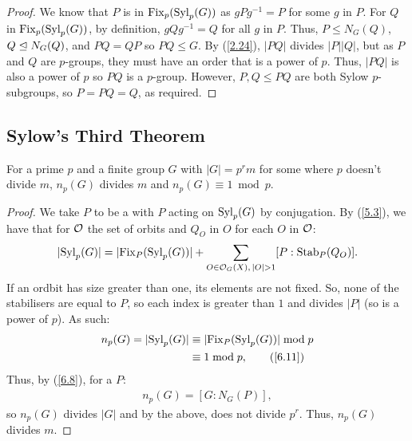 \begin{proof}
    We know that $P$ is in $\operatorname{Fix}_p(\operatorname{Syl}_p(G))$ as $gPg^{-1} = P$
    for some $g$ in $P$. For $Q$ in $\operatorname{Fix}_p(\operatorname{Syl}_p(G))$,
    by definition, $gQg^{-1} = Q$ for all $g$ in $P$. Thus,
    $P \leq N_G(Q)$, $Q \trianglelefteq N_G(Q)$, and $PQ = QP$ so
    $PQ \leq G$. By (\ref{2.24}), $|PQ|$ divides $|P||Q|$,
    but as $P$ and $Q$ are $p$-groups, they must have an order
    that is a power of $p$. Thus, $|PQ|$ is also a power of $p$
    so $PQ$ is a $p$-group. However, $P, Q \leq PQ$ are both
    Sylow $p$-subgroups, so $P = PQ = Q$, as required.
\end{proof}

\subsection{Sylow's Third Theorem} \label{6.10}

For a prime $p$ and a finite group $G$ with
$|G| = p^rm$ for some where $p$ doesn't divide $m$, 
$n_p(G)$ divides $m$ and $n_p(G) \equiv 1 \bmod p$.

\begin{proof}
    We take $P$ to be a \Syls with $P$ acting on $\operatorname{Syl}_p(G)$
    by conjugation. By (\ref{5.3}), we have that
    for $\mathcal{O}$ the set of orbits and
    $Q_O$ in $O$ for each $O$ in $\mathcal{O}$: \begin{align*}
        |\!\operatorname{Syl}_p(G)| = 
        |\!\operatorname{Fix}_P(\operatorname{Syl}_p(G))| 
        + \sum_{O \in \mathcal{O}_G(X), \, |O| > 1} 
            [P : \operatorname{Stab}_P(Q_O)].
    \end{align*} If an ordbit has size greater than one,
    its elements are not fixed. So, none of the stabilisers
    are equal to $P$, so each index is greater than $1$
    and divides $|P|$ (so is a power of $p$). As such: 
    \begin{align*}
        n_p(G) = |\!\Syl_p(G)| 
        &\equiv |\!\Fix_P(\Syl_p(G))| \bmod p \\
        &\equiv 1 \bmod p, \tag{\ref{6.11}}
    \end{align*} Thus, by (\ref{6.8}), for a
    \Syls $P$: \begin{align*}
        n_p(G) = [G : N_G(P)],
    \end{align*} so $n_p(G)$ divides $|G|$ and by the above,
    does not divide $p^r$. Thus, $n_p(G)$ divides $m$.
\end{proof}

